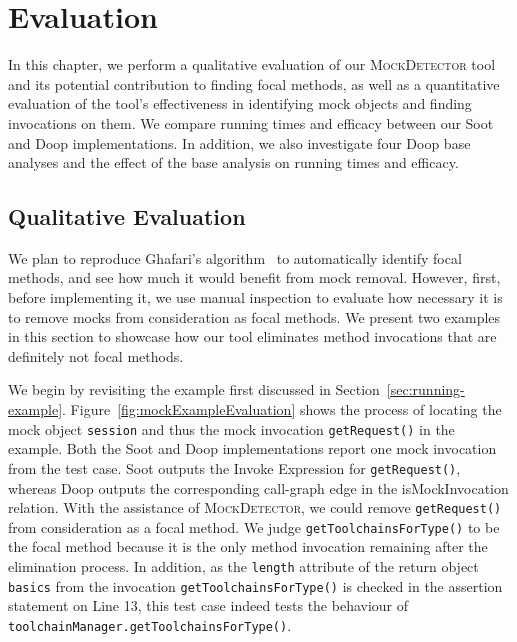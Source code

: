 \chapter{Evaluation}
\label{chap:evaluation}	

In this chapter, we perform a qualitative evaluation of our \textsc{MockDetector} tool and its potential contribution to finding focal methods, as well as a quantitative evaluation of the tool's effectiveness in identifying mock objects and finding invocations on them. We compare running times and efficacy between our Soot and Doop implementations. In addition, we also investigate four Doop base analyses and the effect of the base analysis on running times and efficacy.

\section{Qualitative Evaluation}

We plan to reproduce Ghafari's algorithm~\cite{ghafari15:_autom} to automatically identify focal methods, and see how much it would benefit from mock removal. However, first, before implementing it, we use manual inspection to evaluate how necessary it is to remove mocks from consideration as focal methods. We present two examples in this section to showcase how our tool eliminates method invocations that are definitely not focal methods.

We begin by revisiting the example first discussed in Section~\ref{sec:running-example}. Figure~\ref{fig:mockExampleEvaluation} shows the process of locating the mock object \texttt{session} and thus the mock invocation \texttt{getRequest()} in the example. Both the Soot and Doop implementations report one mock invocation from the test case. Soot outputs the Invoke Expression for \texttt{getRequest()}, whereas Doop outputs the corresponding call-graph edge in the isMockInvocation relation. With the assistance of \textsc{MockDetector}, we could remove \texttt{getRequest()} from consideration as a focal method. We judge \texttt{getToolchainsForType()} to be the focal method because it is the only method invocation remaining after the elimination process. In addition, as the \texttt{length} attribute of the return object \texttt{basics} from the invocation \texttt{getToolchainsForType()} is checked in the assertion statement on Line 13, this test case indeed tests the behaviour of \texttt{toolchainManager.getToolchainsForType()}.

